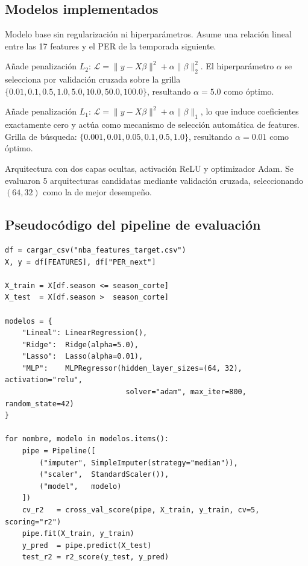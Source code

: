 \documentclass[11pt,a4paper]{article}
\begin{document}
\subsection{Modelos implementados}

\begin{description}[leftmargin=*, itemsep=6pt]
    \item[\textbf{Regresión Lineal.}] Modelo base sin regularización ni
    hiperparámetros. Asume una relación lineal entre las 17 features y el
    PER de la temporada siguiente.

    \item[\textbf{Ridge Regression.}] Añade penalización $L_2$:
    $\mathcal{L} = \|y - X\beta\|^2 + \alpha\|\beta\|_2^2$. El hiperparámetro
    $\alpha$ se selecciona por validación cruzada sobre la grilla
    $\{0.01, 0.1, 0.5, 1.0, 5.0, 10.0, 50.0, 100.0\}$, resultando
    $\alpha=5.0$ como óptimo.

    \item[\textbf{Lasso Regression.}] Añade penalización $L_1$:
    $\mathcal{L} = \|y - X\beta\|^2 + \alpha\|\beta\|_1$, lo que induce
    coeficientes exactamente cero y actúa como mecanismo de selección
    automática de features. Grilla de búsqueda:
    $\{0.001, 0.01, 0.05, 0.1, 0.5, 1.0\}$, resultando $\alpha=0.01$ como
    óptimo.

    \item[\textbf{MLP (red neuronal feedforward).}] Arquitectura con dos
    capas ocultas, activación ReLU y optimizador Adam. Se evaluaron 5
    arquitecturas candidatas mediante validación cruzada, seleccionando
    $(64, 32)$ como la de mejor desempeño.
\end{description}

\subsection{Pseudocódigo del pipeline de evaluación}

\begin{lstlisting}[caption={Esquema general de entrenamiento y evaluación}]
df = cargar_csv("nba_features_target.csv")
X, y = df[FEATURES], df["PER_next"]

X_train = X[df.season <= season_corte]
X_test  = X[df.season >  season_corte]

modelos = {
    "Lineal": LinearRegression(),
    "Ridge":  Ridge(alpha=5.0),    
    "Lasso":  Lasso(alpha=0.01),
    "MLP":    MLPRegressor(hidden_layer_sizes=(64, 32), activation="relu",
                            solver="adam", max_iter=800, random_state=42)
}

for nombre, modelo in modelos.items():
    pipe = Pipeline([
        ("imputer", SimpleImputer(strategy="median")),
        ("scaler",  StandardScaler()),
        ("model",   modelo)
    ])
    cv_r2   = cross_val_score(pipe, X_train, y_train, cv=5, scoring="r2")
    pipe.fit(X_train, y_train)
    y_pred  = pipe.predict(X_test)
    test_r2 = r2_score(y_test, y_pred)
\end{lstlisting}
\end{document}
